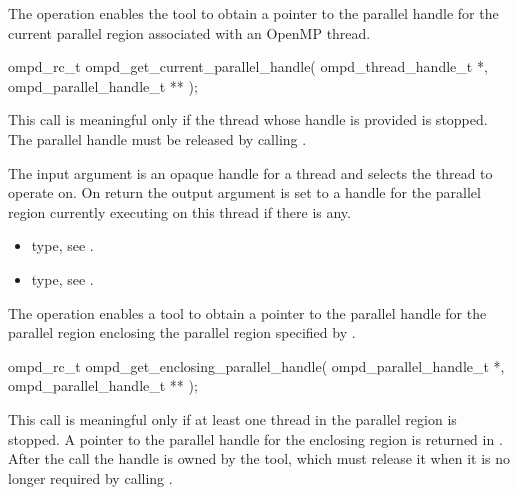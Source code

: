 
\label{ompd:ompd_get_current_parallel_handle}
\summary
The   operation enables the tool to obtain a pointer to 
the parallel handle for the current parallel region associated with an OpenMP thread.

\format

\cspecificstart
\begin{ompSyntax}
ompd_rc_t ompd_get_current_parallel_handle(
  ompd_thread_handle_t *,
  ompd_parallel_handle_t **
);
\end{ompSyntax}
\cspecificend


\descr
This call is meaningful only if the thread whose handle is provided is stopped. The parallel handle 
must be released by calling .

\argdesc
The input argument  is an opaque handle for a thread and selects the thread to operate on.
On return the output argument  is set to a handle for the parallel region
currently executing on this thread if there is any.

\crossreferences
\begin{itemize}
	\item {} type, see .
	\item {} type, see .
\end{itemize}

\label{ompd:ompd_get_enclosing_parallel_handle}
\summary
The    operation enables a tool to obtain a 
pointer to the parallel handle for the parallel region enclosing the parallel region specified by 
.

\format

\cspecificstart
\begin{ompSyntax}
ompd_rc_t ompd_get_enclosing_parallel_handle(
  ompd_parallel_handle_t *,
  ompd_parallel_handle_t **
);
\end{ompSyntax}
\cspecificend


\descr
This call is meaningful only if at least one thread in the parallel region is stopped.
A pointer to the parallel handle for the enclosing region is returned in 
. After the call the handle is owned by the tool, which must 
release it when it is no longer required by calling .

